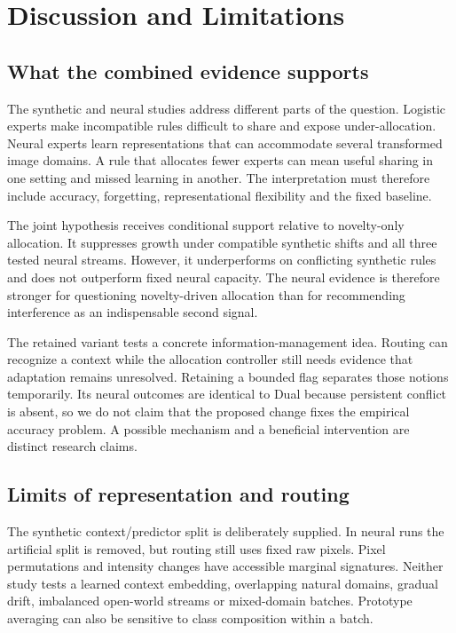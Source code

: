 \section{Discussion and Limitations}
\subsection{What the combined evidence supports}
The synthetic and neural studies address different parts of the question. Logistic experts make incompatible rules difficult to share and expose under-allocation. Neural experts learn representations that can accommodate several transformed image domains. A rule that allocates fewer experts can mean useful sharing in one setting and missed learning in another. The interpretation must therefore include accuracy, forgetting, representational flexibility and the fixed baseline.

The joint hypothesis receives conditional support relative to novelty-only allocation. It suppresses growth under compatible synthetic shifts and all three tested neural streams. However, it underperforms on conflicting synthetic rules and does not outperform fixed neural capacity. The neural evidence is therefore stronger for questioning novelty-driven allocation than for recommending interference as an indispensable second signal.

The retained variant tests a concrete information-management idea. Routing can recognize a context while the allocation controller still needs evidence that adaptation remains unresolved. Retaining a bounded flag separates those notions temporarily. Its neural outcomes are identical to Dual because persistent conflict is absent, so we do not claim that the proposed change fixes the empirical accuracy problem. A possible mechanism and a beneficial intervention are distinct research claims.

\subsection{Limits of representation and routing}
The synthetic context/predictor split is deliberately supplied. In neural runs the artificial split is removed, but routing still uses fixed raw pixels. Pixel permutations and intensity changes have accessible marginal signatures. Neither study tests a learned context embedding, overlapping natural domains, gradual drift, imbalanced open-world streams or mixed-domain batches. Prototype averaging can also be sensitive to class composition within a batch.

